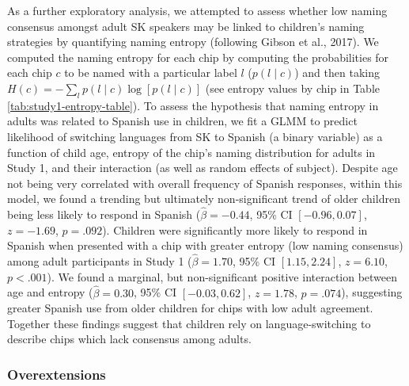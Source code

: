 \documentclass[
  ,apa7,floatsintext]{apa6}
\begin{document}
As a further exploratory analysis, we attempted to assess whether low naming consensus amongst adult SK speakers may be linked to children's naming strategies by quantifying naming entropy (following Gibson et al., 2017). We computed the naming entropy for each chip by computing the probabilities for each chip \(c\) to be named with a particular label \(l\) (\(p(l \mid c)\)) and then taking \(H(c) = -\sum_{l}{p(l\mid c) \log[p(l \mid c)]}\) (see entropy values by chip in Table \ref{tab:study1-entropy-table}). To assess the hypothesis that naming entropy in adults was related to Spanish use in children, we fit a GLMM to predict likelihood of switching languages from SK to Spanish (a binary variable) as a function of child age, entropy of the chip's naming distribution for adults in Study 1, and their interaction (as well as random effects of subject). Despite age not being very correlated with overall frequency of Spanish responses, within this model, we found a trending but ultimately non-significant trend of older children being less likely to respond in Spanish (\(\hat{\beta} = -0.44\), 95\% CI \([-0.96, 0.07]\), \(z = -1.69\), \(p = .092\)). Children were significantly more likely to respond in Spanish when presented with a chip with greater entropy (low naming consensus) among adult participants in Study 1 (\(\hat{\beta} = 1.70\), 95\% CI \([1.15, 2.24]\), \(z = 6.10\), \(p < .001\)). We found a marginal, but non-significant positive interaction between age and entropy (\(\hat{\beta} = 0.30\), 95\% CI \([-0.03, 0.62]\), \(z = 1.78\), \(p = .074\)), suggesting greater Spanish use from older children for chips with low adult agreement. Together these findings suggest that children rely on language-switching to describe chips which lack consensus among adults.

\hypertarget{overextensions}{%
\subsubsection{Overextensions}\label{overextensions}}
\end{document}
